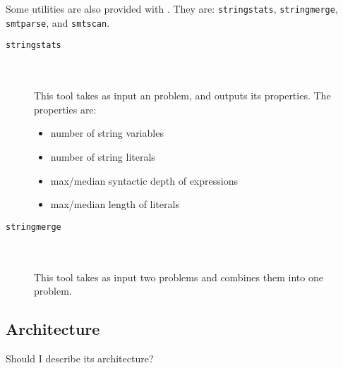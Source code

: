         Some utilities are also provided with \fuzzer{}. They are: \texttt{stringstats}, \texttt{stringmerge}, \texttt{smtparse}, and \texttt{smtscan}.

        \begin{description}

            \item[\texttt{stringstats}] \hfill \\ \\
                This tool takes as input an \smt{} problem, and outputs its properties. The properties are:

                \begin{itemize}
                    \item number of string variables
                    \item number of string literals
                    \item max/median syntactic depth of expressions
                    \item max/median length of literals
                \end{itemize}

                \hfill

            \item[\texttt{stringmerge}] \hfill \\ \\
                This tool takes as input two \smt{} problems and combines them into one problem.

        \end{description}

    \subsection{Architecture}

        Should I describe its architecture?
